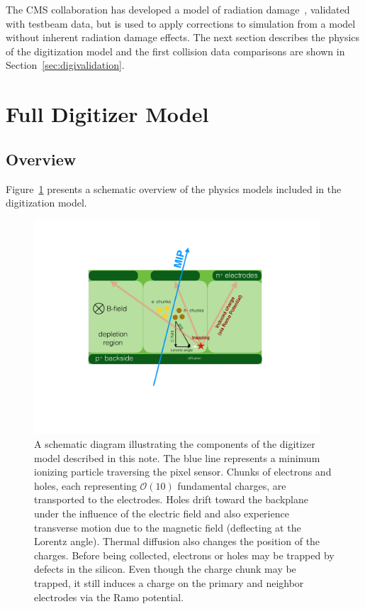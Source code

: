 The CMS collaboration has developed a model of radiation damage~\cite{Contardo:2020886,Swartz2002,Chiochia:2004qh,Swartz:2005vp}, validated with testbeam data, but is used to apply corrections to simulation from a model without inherent radiation damage effects.  The next section describes the physics of the digitization model and the first collision data comparisons are shown in Section~\ref{sec:digivalidation}.


\section{Full Digitizer Model}
\label{sec:fullmodel}

\subsection{Overview}

Figure~\ref{fig:app:raddamge1} presents a schematic overview of the physics models included in the digitization model.   
\begin{figure}[htpb!]
\centering
\includegraphics[width=0.95\textwidth]{DigitizerSchematic}
\caption{A schematic diagram illustrating the components of the digitizer model described in this note.  The blue line represents a minimum ionizing particle traversing the pixel sensor.  Chunks of electrons and holes, each representing $\mathcal{O}(10)$ fundamental charges, are transported to the electrodes.  Holes drift toward the backplane under the influence of the electric field and also experience transverse motion due to the magnetic field (deflecting at the Lorentz angle).  Thermal diffusion also changes the position of the charges.  Before being collected, electrons or holes may be trapped by defects in the silicon.  Even though the charge chunk may be trapped, it still induces a charge on the primary and neighbor electrodes via the Ramo potential.  }
\label{fig:app:raddamge1}
\end{figure}

